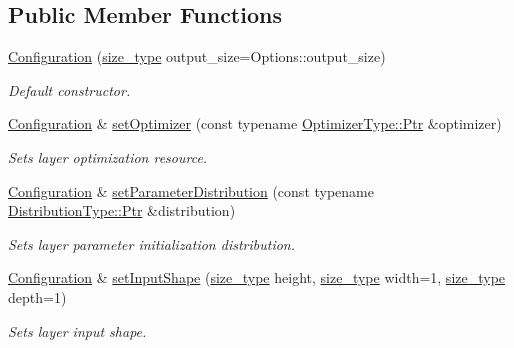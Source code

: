\subsection*{Public Member Functions}
\begin{DoxyCompactItemize}
\item 
\hyperlink{classffnn_1_1layer_1_1fully__connected_1_1_configuration_a46345daef6856da316aa802a1faa7aa5}{Configuration} (\hyperlink{namespaceffnn_a63b90a2fd70eb76684eac482a51633e5}{size\-\_\-type} output\-\_\-size=Options\-::output\-\_\-size)
\begin{DoxyCompactList}\small\item\em Default constructor. \end{DoxyCompactList}\item 
\hyperlink{classffnn_1_1layer_1_1fully__connected_1_1_configuration}{Configuration} \& \hyperlink{classffnn_1_1layer_1_1fully__connected_1_1_configuration_aa5f4f697dec7bc7457b0448c39174c19}{set\-Optimizer} (const typename \hyperlink{classffnn_1_1optimizer_1_1_optimizer_ac03e7181934bf0c12a97fc67a60484ab}{Optimizer\-Type\-::\-Ptr} \&optimizer)
\begin{DoxyCompactList}\small\item\em Sets layer optimization resource. \end{DoxyCompactList}\item 
\hyperlink{classffnn_1_1layer_1_1fully__connected_1_1_configuration}{Configuration} \& \hyperlink{classffnn_1_1layer_1_1fully__connected_1_1_configuration_a66ce1823e1154fb558df93c7f02a6b13}{set\-Parameter\-Distribution} (const typename \hyperlink{classffnn_1_1distribution_1_1_distribution_a51d4ea875b70b07862c5f68b20c8f41a}{Distribution\-Type\-::\-Ptr} \&distribution)
\begin{DoxyCompactList}\small\item\em Sets layer parameter initialization distribution. \end{DoxyCompactList}\item 
\hyperlink{classffnn_1_1layer_1_1fully__connected_1_1_configuration}{Configuration} \& \hyperlink{classffnn_1_1layer_1_1fully__connected_1_1_configuration_a33b5f0b6e3f7b5ed0f36298f0260a4f2}{set\-Input\-Shape} (\hyperlink{namespaceffnn_a63b90a2fd70eb76684eac482a51633e5}{size\-\_\-type} height, \hyperlink{namespaceffnn_a63b90a2fd70eb76684eac482a51633e5}{size\-\_\-type} width=1, \hyperlink{namespaceffnn_a63b90a2fd70eb76684eac482a51633e5}{size\-\_\-type} depth=1)
\begin{DoxyCompactList}\small\item\em Sets layer input shape. \end{DoxyCompactList}\item 

\end{DoxyCompactItemize}
